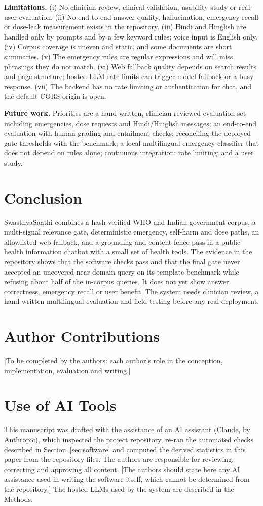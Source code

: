 \documentclass[10pt,a4paper]{article}
\begin{document}
\textbf{Limitations.}
(i) No clinician review, clinical validation, usability study or real-user evaluation.
(ii) No end-to-end answer-quality, hallucination, emergency-recall or dose-leak measurement exists in the repository.
(iii) Hindi and Hinglish are handled only by prompts and by a few keyword rules; voice input is English only.
(iv) Corpus coverage is uneven and static, and some documents are short summaries.
(v) The emergency rules are regular expressions and will miss phrasings they do not match.
(vi) Web fallback quality depends on search results and page structure; hosted-LLM rate limits can trigger model fallback or a busy response.
(vii) The backend has no rate limiting or authentication for chat, and the default CORS origin is open.

\textbf{Future work.} Priorities are a hand-written, clinician-reviewed evaluation set including emergencies, dose requests and Hindi/Hinglish messages; an end-to-end evaluation with human grading and entailment checks; reconciling the deployed gate thresholds with the benchmark; a local multilingual emergency classifier that does not depend on rules alone; continuous integration; rate limiting; and a user study.

\section{Conclusion}
SwasthyaSaathi combines a hash-verified WHO and Indian government corpus, a multi-signal relevance gate, deterministic emergency, self-harm and dose paths, an allowlisted web fallback, and a grounding and content-fence pass in a public-health information chatbot with a small set of health tools. The evidence in the repository shows that the software checks pass and that the final gate never accepted an uncovered near-domain query on its template benchmark while refusing about half of the in-corpus queries. It does not yet show answer correctness, emergency recall or user benefit. The system needs clinician review, a hand-written multilingual evaluation and field testing before any real deployment.

\section*{Author Contributions}
[To be completed by the authors: each author's role in the conception, implementation, evaluation and writing.]

\section*{Use of AI Tools}
This manuscript was drafted with the assistance of an AI assistant (Claude, by Anthropic), which inspected the project repository, re-ran the automated checks described in Section~\ref{sec:software} and computed the derived statistics in this paper from the repository files. The authors are responsible for reviewing, correcting and approving all content. [The authors should state here any AI assistance used in writing the software itself, which cannot be determined from the repository.] The hosted LLMs used by the system are described in the Methods.
\end{document}
